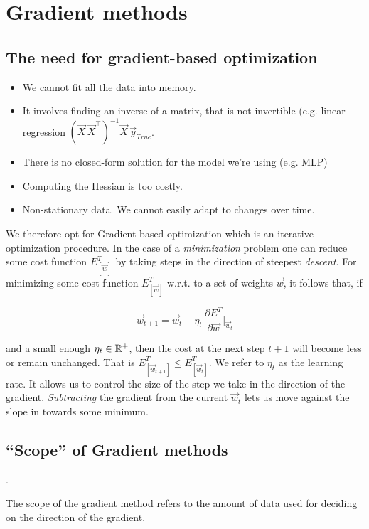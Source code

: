 \section{Gradient methods}

\subsection{The need for gradient-based optimization}

\begin{frame}






\begin{itemize}
	\item We cannot fit all the data into memory.
	\item It involves finding an inverse of a matrix, that is not invertible (e.g. linear regression $(\vec X \, \vec X^\top)^{-1}\vec X \, \vec y_{True}^\top$.
	\item There is no closed-form solution for the model we're using (e.g. MLP)
	\item Computing the Hessian is too costly.
	\item Non-stationary data. We cannot easily adapt to changes over time.
\end{itemize}

\end{frame}

We therefore opt for Gradient-based optimization which is an iterative optimization procedure. 
In the case of a \emph{minimization} problem one can reduce some cost function $E^T_{[\vec w]}$ by taking steps in the direction of steepest \emph{descent}.
For minimizing some cost function $E^T_{[\vec w]}$ w.r.t. to a set of weights $\vec w$, it follows that, if

\begin{equation}
\vec w_{t+1} = \vec w_t - \eta_t \, \frac{\partial E^T}{\partial \vec w} \Bigg|_{\vec w_t}
\end{equation}

and a small enough $\eta_t \in \mathbb{R}^+$, then the cost at the next step $t+1$ will become less or remain unchanged. That is $E^T_{[\vec w_{t+1}]} \le E^T_{[\vec w_{t}]}$.
We refer to $\eta_t$ as the learning rate. It allows us to control the size of the step we take in the direction of the gradient.
\emph{Subtracting} the gradient from the current $\vec w_t$ lets us move against the slope in towards some minimum. 

\subsection{``Scope'' of Gradient methods}.

The scope of the gradient method refers to the amount of data used for deciding on the direction of the gradient.



